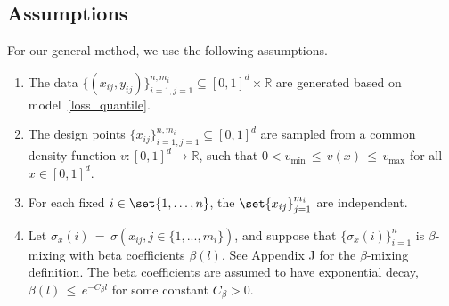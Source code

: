 \documentclass[twoside,11pt]{article}
\begin{document}
\subsection{Assumptions}
\begin{assumption}
    \label{Assumption 1.} For our general method, we use the following assumptions. 

\begin{enumerate}[label={\bfseries\arabic*.}, ref={\ref{Assumption 1.}.\arabic*}]
\item\label{ass_1_1} The data $\{(x_{ij},y_{ij})\}_{i=1,j=1}^{n,m_i} \subseteq [0,1]^d \times \mathbb{R}$ are generated based on model~\eqref{loss_quantile}.
\item
\label{ass_1_1_1} The design points \(\{x_{ij}\}_{i=1,j=1}^{n,m_i} \subseteq [0,1]^{d}\) are sampled from a common density function \(v : [0,1]^{d} \rightarrow \mathbb{R}\), such that \(0 < v_{\min} \,\leq\, v(x) \,\leq\, v_{\max}\) for all \(x \in [0,1]^{d}\). 
\item 
\label{ass_1_2}For each fixed $i \in \set{1, \dots, n}$, the $\set{x_{ij}}_{j=1}^{m_i}$ are independent. 
\item 
\label{ass_c_beta}
Let \(\sigma_x(i) \,=\, \sigma(x_{ij}, j\in \{1,...,m_i\})\), and suppose that \(\{\sigma_x(i)\}^{n}_{i=1}\) is \(\beta\)-mixing with beta coefficients \(\beta(l)\). See Appendix J for the \(\beta\)-mixing definition. The beta coefficients are assumed to have exponential decay, \(\beta(l) \,\leq\, e^{-C_{\beta}l}\) for some constant \(C_{\beta} > 0\). 


\end{enumerate}
\end{assumption}
\end{document}
